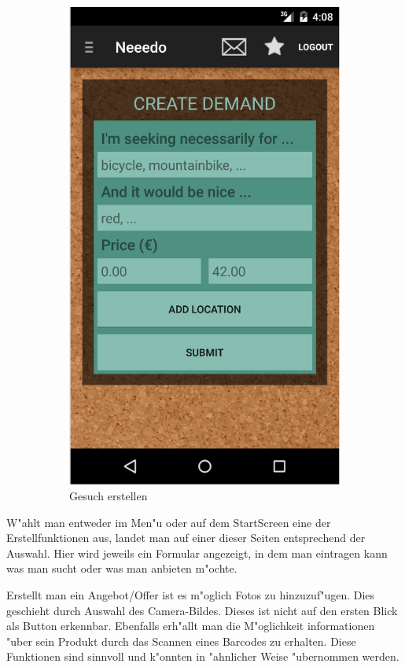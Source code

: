 \begin{figure}[H]
\begin{subfigure}{0.5\textwidth}
\includegraphics[width=0.9\linewidth]{./Bilder/createDemand.png}
\caption{Gesuch erstellen}
\label{fig:demand}
\end{subfigure}
\caption{}
\label{fig:image4}
\end{figure}

W"ahlt man entweder im Men"u oder auf dem StartScreen eine der Erstellfunktionen aus, landet man auf einer dieser Seiten entsprechend der Auswahl.
Hier wird jeweils ein Formular angezeigt, in dem man eintragen kann was man sucht oder was man anbieten m"ochte. 

Erstellt man ein Angebot/Offer ist es m"oglich Fotos zu hinzuzuf"ugen. 
Dies geschieht durch Auswahl des Camera-Bildes. Dieses ist nicht auf den ersten Blick als Button erkennbar. 
Ebenfalls erh"allt man die M"oglichkeit informationen "uber sein Produkt durch das Scannen eines Barcodes zu erhalten. 
Diese Funktionen sind sinnvoll und k"onnten in "ahnlicher Weise "ubernommen werden.

